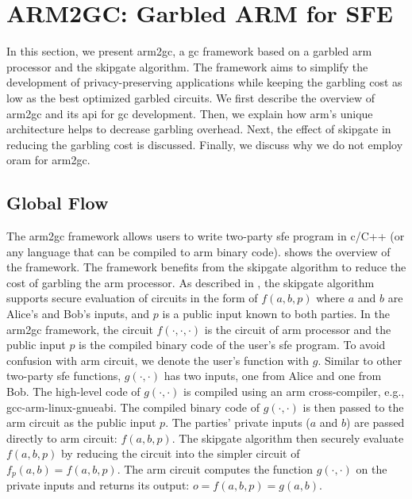 \section{ARM2GC: Garbled ARM for SFE}\label{sec:processor-arm}
In this section, we present \gls{arm2gc}, a \acrshort{gc} framework based on a garbled \gls{arm} processor and the \gls{skipgate} algorithm.
The framework aims to simplify the development of privacy-preserving applications while keeping the garbling cost as low as the best optimized garbled circuits.
We first describe the overview of \gls{arm2gc} and its \acrfull{api} for \acrshort{gc} development.
Then, we explain how \gls{arm}'s unique architecture helps to decrease garbling overhead.
Next, the effect of \gls{skipgate} in reducing the garbling cost is discussed.
Finally, we discuss why we do not employ \acrshort{oram} for \gls{arm2gc}.

\subsection{Global Flow}\label{ssec:arm-global}
The \gls{arm2gc} framework allows users to write two-party \acrshort{sfe} program in \gls{c}/C++ (or any language that can be compiled to \gls{arm} binary code).
 shows the overview of the framework.
The framework benefits from the \gls{skipgate} algorithm to reduce the cost of garbling the \gls{arm} processor.
As described in , the \gls{skipgate} algorithm supports secure evaluation of circuits in the form of $f(a,b,p)$ where $a$ and $b$ are Alice's and Bob's inputs, and $p$ is a public input known to both parties.
In the \gls{arm2gc} framework, the circuit $f(\cdot,\cdot,\cdot)$ is the circuit of \gls{arm} processor and the public input $p$ is the compiled binary code of the user's \acrshort{sfe} program.
To avoid confusion with \gls{arm} circuit, we denote the user's function with $g$.
Similar to other two-party \acrshort{sfe} functions, $g(\cdot,\cdot)$ has two inputs, one from Alice and one from Bob.
The high-level code of $g(\cdot,\cdot)$ is compiled using an \gls{arm} cross-compiler, e.g., gcc-arm-linux-gnueabi.
The compiled binary code of $g(\cdot,\cdot)$ is then passed to the \gls{arm} circuit as the public input $p$.
The parties' private inputs ($a$ and $b$) are passed directly to \gls{arm} circuit: $f(a,b,p)$.
The \gls{skipgate} algorithm then securely evaluate $f(a,b,p)$ by reducing the circuit into the simpler circuit of $f_{p}(a,b) = f(a,b,p)$.
The \gls{arm} circuit computes the function $g(\cdot,\cdot)$ on the private inputs and returns its output: $o = f(a,b,p) = g(a,b)$.

